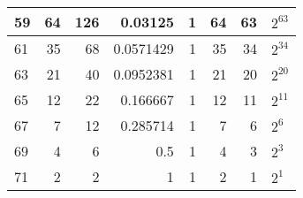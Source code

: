 \documentclass[10pt,a4paper]{standalone}
\begin{document}
\begin{tabular}{l|r|r|r|r|r|r|l|}
59 & 64 & 126 & 0.03125 & 1 & 64 & 63 & $2^{63}$ \\ \hline
61 & 35 & 68 & 0.0571429 & 1 & 35 & 34 & $2^{34}$ \\ \hline
63 & 21 & 40 & 0.0952381 & 1 & 21 & 20 & $2^{20}$ \\ \hline
65 & 12 & 22 & 0.166667 & 1 & 12 & 11 & $2^{11}$ \\ \hline
67 & 7 & 12 & 0.285714 & 1 & 7 & 6 & $2^{6}$ \\ \hline
69 & 4 & 6 & 0.5 & 1 & 4 & 3 & $2^{3}$ \\ \hline
71 & 2 & 2 & 1 & 1 & 2 & 1 & $2^{1}$ \\ \hline
\end{tabular}
\end{document}
